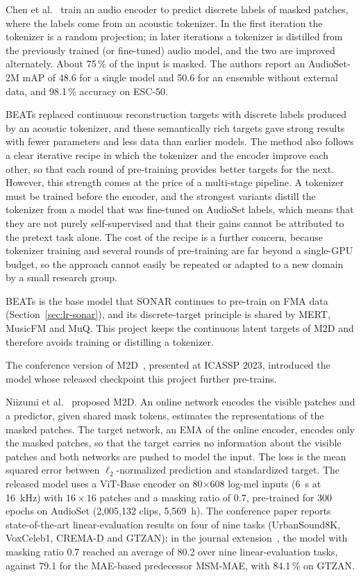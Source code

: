 \documentclass{FastFyp}
\begin{document}
\lrsummary
Chen et al.~\cite{ref:Chen:2023beats} train an audio encoder to predict discrete labels of masked patches, where the labels come from an acoustic tokenizer. In the first iteration the tokenizer is a random projection; in later iterations a tokenizer is distilled from the previously trained (or fine-tuned) audio model, and the two are improved alternately. About 75\,\% of the input is masked. The authors report an AudioSet-2M mAP of 48.6 for a single model and 50.6 for an ensemble without external data, and 98.1\,\% accuracy on ESC-50.

\lrcritical
BEATs replaced continuous reconstruction targets with discrete labels produced by an acoustic tokenizer, and these semantically rich targets gave strong results with fewer parameters and less data than earlier models. The method also follows a clear iterative recipe in which the tokenizer and the encoder improve each other, so that each round of pre-training provides better targets for the next. However, this strength comes at the price of a multi-stage pipeline. A tokenizer must be trained before the encoder, and the strongest variants distill the tokenizer from a model that was fine-tuned on AudioSet labels, which means that they are not purely self-supervised and that their gains cannot be attributed to the pretext task alone. The cost of the recipe is a further concern, because tokenizer training and several rounds of pre-training are far beyond a single-GPU budget, so the approach cannot easily be repeated or adapted to a new domain by a small research group.

\lrrelation
BEATs is the base model that SONAR continues to pre-train on FMA data (Section~\ref{sec:lr-sonar}), and its discrete-target principle is shared by MERT, MusicFM and MuQ. This project keeps the continuous latent targets of M2D and therefore avoids training or distilling a tokenizer.

The conference version of M2D~\cite{ref:Niizumi:2023m2d}, presented at ICASSP 2023, introduced the model whose released checkpoint this project further pre-trains.

\lrsummary
Niizumi et al.~\cite{ref:Niizumi:2023m2d} proposed M2D. An online network encodes the visible patches and a predictor, given shared mask tokens, estimates the representations of the masked patches. The target network, an EMA of the online encoder, encodes only the masked patches, so that the target carries no information about the visible patches and both networks are pushed to model the input. The loss is the mean squared error between $\ell_2$-normalized prediction and standardized target. The released model uses a ViT-Base encoder on 80$\times$608 log-mel inputs (6~s at 16~kHz) with $16\times16$ patches and a masking ratio of 0.7, pre-trained for 300 epochs on AudioSet (2,005,132 clips, 5,569~h). The conference paper reports state-of-the-art linear-evaluation results on four of nine tasks (UrbanSound8K, VoxCeleb1, CREMA-D and GTZAN); in the journal extension~\cite{ref:Niizumi:2024m2dx}, the model with masking ratio 0.7 reached an average of 80.2 over nine linear-evaluation tasks, against 79.1 for the MAE-based predecessor MSM-MAE, with 84.1\,\% on GTZAN.
\end{document}
